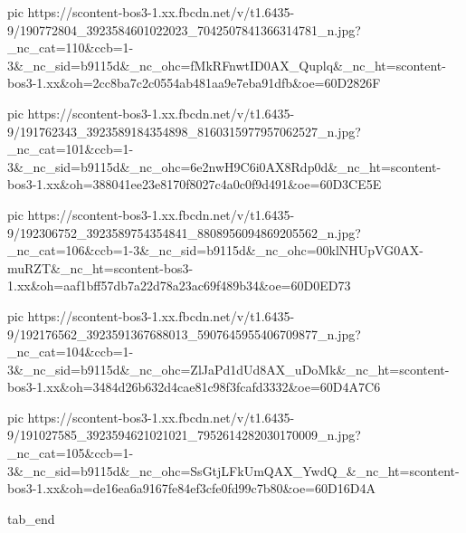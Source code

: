   pic https://scontent-bos3-1.xx.fbcdn.net/v/t1.6435-9/190772804_3923584601022023_7042507841366314781_n.jpg?_nc_cat=110&ccb=1-3&_nc_sid=b9115d&_nc_ohc=fMkRFnwtID0AX_Quplq&_nc_ht=scontent-bos3-1.xx&oh=2cc8ba7c2c0554ab481aa9e7eba91dfb&oe=60D2826F

  pic https://scontent-bos3-1.xx.fbcdn.net/v/t1.6435-9/191762343_3923589184354898_8160315977957062527_n.jpg?_nc_cat=101&ccb=1-3&_nc_sid=b9115d&_nc_ohc=6e2nwH9C6i0AX8Rdp0d&_nc_ht=scontent-bos3-1.xx&oh=388041ee23e8170f8027c4a0c0f9d491&oe=60D3CE5E

  pic https://scontent-bos3-1.xx.fbcdn.net/v/t1.6435-9/192306752_3923589754354841_8808956094869205562_n.jpg?_nc_cat=106&ccb=1-3&_nc_sid=b9115d&_nc_ohc=00klNHUpVG0AX-muRZT&_nc_ht=scontent-bos3-1.xx&oh=aaf1bff57db7a22d78a23ac69f489b34&oe=60D0ED73

  pic https://scontent-bos3-1.xx.fbcdn.net/v/t1.6435-9/192176562_3923591367688013_5907645955406709877_n.jpg?_nc_cat=104&ccb=1-3&_nc_sid=b9115d&_nc_ohc=ZlJaPd1dUd8AX_uDoMk&_nc_ht=scontent-bos3-1.xx&oh=3484d26b632d4cae81c98f3fcafd3332&oe=60D4A7C6

  pic https://scontent-bos3-1.xx.fbcdn.net/v/t1.6435-9/191027585_3923594621021021_7952614282030170009_n.jpg?_nc_cat=105&ccb=1-3&_nc_sid=b9115d&_nc_ohc=SsGtjLFkUmQAX_YwdQ_&_nc_ht=scontent-bos3-1.xx&oh=de16ea6a9167fe84ef3cfe0fd99c7b80&oe=60D16D4A

tab_end
\fi

